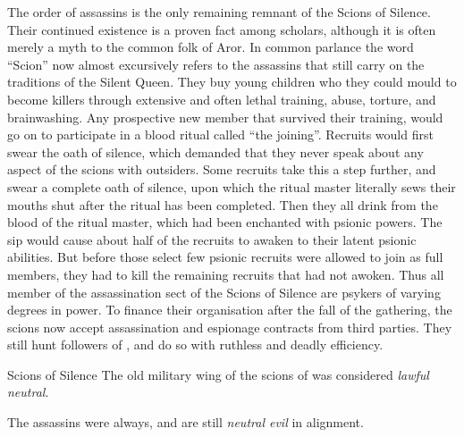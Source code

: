 The order of assassins is the only remaining remnant of the Scions of Silence.
Their continued existence is a proven fact among scholars, although it is
often merely a myth to the common folk of Aror. In common parlance the word
``Scion'' now almost excursively refers to the assassins that still carry on
the traditions of the Silent Queen. They buy young children who they could
mould to become killers through extensive and often lethal training, abuse,
torture, and brainwashing. Any prospective new member that survived their
training, would go on to participate in a blood ritual called ``the joining''.
Recruits would first swear the oath of silence, which demanded that they never
speak about any aspect of the scions with outsiders. Some recruits take this a
step further, and swear a complete oath of silence, upon which the ritual
master literally sews their mouths shut after the ritual has been
completed. Then they all drink from the blood of the ritual master, which had
been enchanted with psionic powers. The sip would cause about half of the
recruits to awaken to their latent psionic abilities. But before those select
few psionic recruits were allowed to join as full members, they had to kill
the remaining recruits that had not awoken. Thus all member of the
assassination sect of the Scions of Silence are psykers of varying degrees in
power. To finance their organisation after the fall of the gathering, the
scions now accept assassination and espionage contracts from third parties.
They still hunt followers of , and do so with ruthless and
deadly efficiency.


\begin{35e}{Scions of Silence}
  The old military wing of the scions of was considered \emph{lawful neutral}.

  The assassins were always, and are still \emph{neutral evil} in alignment.
\end{35e}
